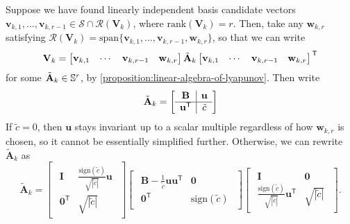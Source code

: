 \documentclass{article}
\theoremstyle{definition}
\theoremstyle{plain}
\newcommand{\vu}{{\mathbf{u}}}
\newcommand{\vv}{{\mathbf{v}}}
\newcommand{\vw}{{\mathbf{w}}}
\newcommand{\vA}{{\mathbf{A}}}
\newcommand{\vB}{{\mathbf{B}}}
\newcommand{\vI}{{\mathbf{I}}}
\newcommand{\vV}{{\mathbf{V}}}
\newcommand{\cR}{{\mathcal{R}}}
\newcommand{\cS}{{\mathcal{S}}}
\newcommand{\transpose}{\mathsf{T}}
\begin{document}
Suppose we have found linearly independent basis candidate vectors $\vv_{k,1}, \dots, \vv_{k,r-1} \in \cS \cap \cR(\vV_k)$, where $\mathrm{rank}(\vV_k) = r$.
Then, take any $\vw_{k,r}$ satisfying $\cR(\vV_k) = \mathrm{span}\{\vv_{k,1}, \dots, \vv_{k,r-1}, \vw_{k,r}\}$, so that we can write
\begin{align*}
    \vV_k = \begin{bmatrix} \vv_{k,1} & \cdots & \vv_{k,r-1} & \vw_{k,r} \end{bmatrix} \Tilde{\vA}_k \begin{bmatrix} \vv_{k,1} & \cdots & \vv_{k,r-1} & \vw_{k,r} \end{bmatrix}^{\,\transpose}
\end{align*}
for some $\Tilde{\vA}_k \in \mathbb{S}^r$, by \cref{proposition:linear-algebra-of-lyapunov}.
Then write
\begingroup
\setlength{\arraycolsep}{8pt}
\renewcommand{\arraystretch}{1.2}
\begin{align*}
    \Tilde{\vA}_k = \begin{bmatrix}
    \begin{array}{c|c}
        \vB & \vu \\
        \hline
        \vu^\transpose & \tilde{c}
    \end{array}
    \end{bmatrix}
\end{align*}
\endgroup
If $\tilde{c} = 0$, then $\vu$ stays invariant up to a scalar multiple regardless of how $\vw_{k,r}$ is chosen, so it cannot be essentially simplified further.
Otherwise, we can rewrite $\tilde{\vA}_k$ as
\begingroup
\setlength{\arraycolsep}{8pt}
\renewcommand{\arraystretch}{1.25}
\[
    \tilde{\vA}_k = \begin{bmatrix}
        \begin{array}{c|c}
        \vI & \frac{\mathrm{sign}(\tilde{c})}{\sqrt{|\tilde{c}|}}\vu \\
        \hline
        \mathbf{0}^\transpose & \sqrt{|\tilde{c}|}
    \end{array}
    \end{bmatrix}
    \begin{bmatrix}
    \begin{array}{c|c}
        \vB - \frac{1}{\tilde{c}}\vu\vu^\transpose & \mathbf{0} \\
        \hline
        \mathbf{0}^\transpose & \mathrm{sign}(\tilde{c})
    \end{array}
    \end{bmatrix}
    \begin{bmatrix}
        \begin{array}{c|c}
        \vI & \mathbf{0} \\
        \hline
        \frac{\mathrm{sign}(\tilde{c})}{\sqrt{|\tilde{c}|}}\vu^\transpose & \sqrt{|\tilde{c}|}
    \end{array}
    \end{bmatrix} .
\]
\end{document}
